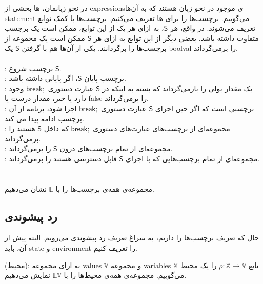 در نحو زبانمان، ها بخشی از \glspl*{expression}ی موجود در نحو زبان هستند که به آن‌ها \gls{statement} می‌گوییم. برچسب‌ها را برای ها تعریف می‌کنیم. برچسب‌ها با کمک توابع  تعریف می‌شوند. در‌ واقع، هر $\mathsf{S}$، به ازای هر یک از این توابع، ممکن است یک برجسب متفاوت داشته باشد. بعضی دیگر از این توابع به ازای هر $\mathsf{S}$ ممکن است یک مجموعه از برچسب‌ها را برگردانند. یکی از آن‌ها هم با گرفتن $\mathsf{S}$ یک \gls{boolval} را بر‌می‌گرداند. 
\\\\
 : برچسب شروع $\mathsf{S}$.\\
 : برچسب پایان $\mathsf{S}$، اگر پایانی داشته باشد.\\
 : یک مقدار بولی را باز‌‌می‌گرداند که بسته به اینکه در $\mathsf{S}$ عبارت دستوری $\mathsf{break;}$ وجود دارد یا خیر، مقدار درست یا \gls*{false} را بر‌می‌گرداند.\\
 : 
برچسبی است که اگر حین اجرای $\mathsf{S}$ عبارت دستوری $\mathsf{break;}$ اجرا شود، برنامه از آن برچسب ادامه پیدا می کند.\\
 :
مجموعه‌ای از برچسب‌های عبارت‌های دستوری
$\mathsf{break;}$
که داخل $\mathsf{S}$ هستند را بر‌می‌گرداند.\\
 : مجموعه‌ای از تمام برچسب‌های درون $\mathsf{S}$ را برمی‌گرداند.\\
 : مجموعه‌ای از تمام بر‌چسب‌هایی که با اجرای $\mathsf{S}$ قابل دسترسی هستند را بر‌می‌گرداند.\\\\\\
مجموعه‌ی همه‌ی برچسب‌ها را با 
$\mathbb{L}$
نشان می‌دهیم.

\subsection{رد پیشوندی}


حال که تعریف برچسب‌ها را داریم، به سراغ تعریف رد پیشوندی می‌رویم. البته پیش از آن، باید \gls{state}‌ و \gls{environment}‌ را تعریف کنیم.
\begin{defn}
	(محیط): به ازای مجموعه \glspl{value}
	 $\mathbb{V}$
	  و مجموعه \glspl{variable} 
	  $\mathbb{X}$ تابع 
	$\rho : \mathbb{X} \rightarrow \mathbb{V}$ 
	را یک محیط می‌گوییم. مجموعه‌ی همه‌ی محیط‌ها را با $\mathbb{EV}$ نمایش می‌دهیم.
\end{defn}

